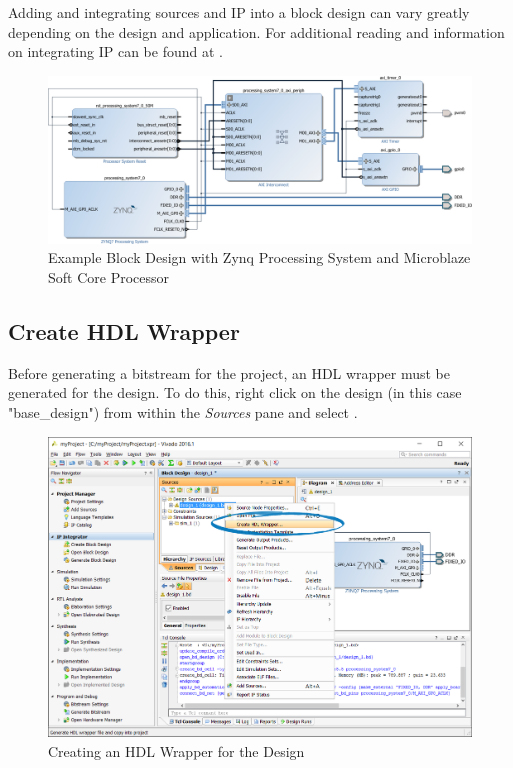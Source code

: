 Adding and integrating sources and IP into a block design can vary greatly depending on the design and application. For additional reading and information on integrating IP can be found at \nocite{xilinxug896:15}. %


\clearpage
\begin{figure}
	\centering
	\includegraphics{images/vivado/block_diagram.png}
	\caption[Example Vivado Block Design]{Example Block Design with Zynq Processing System and Microblaze Soft Core Processor}
	\label{fig:exampleblockdesign}
\end{figure}


\subsection{Create HDL Wrapper}

Before generating a bitstream for the project, an HDL wrapper must be generated for the design. To do this, right click on the design (in this case "base\_design") from within the \textit{Sources} pane and select . 


\begin{figure}
	\centering
	\includegraphics{images/vivado/create_hdl_wrapper.png}
	\caption{Creating an HDL Wrapper for the Design}
	\label{fig:createhdlwrapper}
\end{figure}


